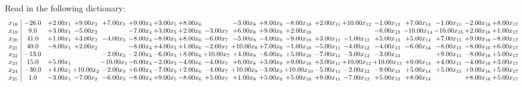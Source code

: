 \documentclass[9pt]{article}
\begin{document}
Read in the following dictionary:
\[\begin{array}{c| c c@{\hskip 2pt} c@{\hskip 2pt} c@{\hskip 2pt} c@{\hskip 2pt} c@{\hskip 2pt} c@{\hskip 2pt} c@{\hskip 2pt} c@{\hskip 2pt} c@{\hskip 2pt} c@{\hskip 2pt} c@{\hskip 2pt} c@{\hskip 2pt} c@{\hskip 2pt} c@{\hskip 2pt} c@{\hskip 2pt} c@{\hskip 2pt} c@{\hskip 2pt} }
 x_{18}   &  -26.0 & +  2.00 x_{1} & +  9.00 x_{2} & +  7.00 x_{3} & +  9.00 x_{4} & +  3.00 x_{5} & +  8.00 x_{6} &   & -3.00 x_{8} & +  8.00 x_{9} & -8.00 x_{10} & +  2.00 x_{11} & + 10.00 x_{12} & -1.00 x_{13} & +  7.00 x_{14} & -1.00 x_{15} & -2.00 x_{16} & +  8.00 x_{17}\\
 x_{19}   &  9.0 & +  3.00 x_{1} & -5.00 x_{2} &   & -7.00 x_{4} & +  3.00 x_{5} & +  2.00 x_{6} & -3.00 x_{7} & +  6.00 x_{8} & +  9.00 x_{9} & +  2.00 x_{10} &    &   & -6.00 x_{13} & -10.00 x_{14} & -10.00 x_{15} & +  2.00 x_{16} & +  1.00 x_{17}\\
 x_{20}   &  41.0 & +  1.00 x_{1} & +  3.00 x_{2} & -4.00 x_{3} & -8.00 x_{4} & -8.00 x_{5} & +  8.00 x_{6} & -6.00 x_{7} & -5.00 x_{8} & -4.00 x_{9} & -9.00 x_{10} & +  3.00 x_{11} & -1.00 x_{12} & +  5.00 x_{13} & +  5.00 x_{14} & +  7.00 x_{15} & +  9.00 x_{16} & -8.00 x_{17}\\
 x_{21}   &  49.0 & -8.00 x_{1} & +  2.00 x_{2} &   & -8.00 x_{4} & +  4.00 x_{5} & +  1.00 x_{6} & -2.00 x_{7} & + 10.00 x_{8} & +  7.00 x_{9} & -1.00 x_{10} & -5.00 x_{11} & -4.00 x_{12} & -4.00 x_{13} & -6.00 x_{14} & -8.00 x_{15} & -8.00 x_{16} & +  6.00 x_{17}\\
 x_{22}   &  -13.0  &    &   & -2.00 x_{3} & -2.00 x_{4} & -6.00 x_{5} & +  8.00 x_{6} & + 10.00 x_{7} & +  4.00 x_{8} & -6.00 x_{9} & +  5.00 x_{10} & -7.00 x_{11} & -3.00 x_{12} & -3.00 x_{13} &   & +  9.00 x_{15} & -8.00 x_{16} & +  5.00 x_{17}\\
 x_{23}   &  15.0 & +  5.00 x_{1} &   & -10.00 x_{3} & -6.00 x_{4} & -2.00 x_{5} & -4.00 x_{6} & -4.00 x_{7} & +  6.00 x_{8} & +  3.00 x_{9} & +  9.00 x_{10} & +  3.00 x_{11} & + 10.00 x_{12} & + 10.00 x_{13} & +  9.00 x_{14} & +  4.00 x_{15} & -4.00 x_{16} & +  3.00 x_{17}\\
 x_{24}   &  -30.0 & +  4.00 x_{1} & + 10.00 x_{2} & -2.00 x_{3} & +  6.00 x_{4} & -7.00 x_{5} & +  2.00 x_{6} & -4.00 x_{7} & + 10.00 x_{8} & -3.00 x_{9} & + 10.00 x_{10} & -5.00 x_{11} & -2.00 x_{12} & -9.00 x_{13} & +  5.00 x_{14} & +  5.00 x_{15} & +  9.00 x_{16} & +  5.00 x_{17}\\
 x_{25}   &  1.0 & -3.00 x_{1} & -7.00 x_{2} & -6.00 x_{3} & -8.00 x_{4} & +  9.00 x_{5} & -8.00 x_{6} & +  5.00 x_{7} & +  1.00 x_{8} & +  5.00 x_{9} & +  5.00 x_{10} & +  9.00 x_{11} & -7.00 x_{12} & +  5.00 x_{13} & +  8.00 x_{14} &   & +  8.00 x_{16} & +  5.00 x_{17}\\

\end{array}\]
\end{document}
